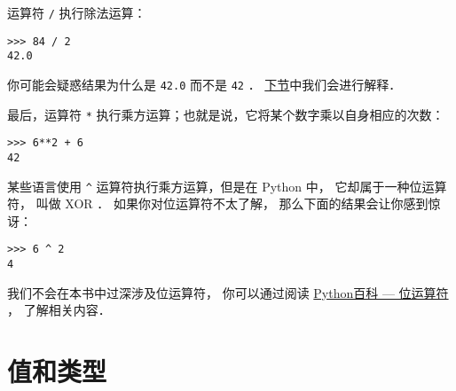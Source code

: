 %

运算符 \lstinline{/} 执行除法运算：


\begin{lstlisting}
>>> 84 / 2
42.0
\end{lstlisting}

%

你可能会疑惑结果为什么是 \lstinline{42.0} 而不是 \lstinline{42} ． \hyperref[value_types]{下节}中我们会进行解释．


最后，运算符 \lstinline{*} 执行乘方运算；也就是说，它将某个数字乘以自身相应的次数：

\begin{lstlisting}
>>> 6**2 + 6
42
\end{lstlisting}


%

某些语言使用 \lstinline{^} 运算符执行乘方运算，但是在 Python 中， 它却属于一种位运算符， 叫做 XOR ． 如果你对位运算符不太了解， 那么下面的结果会让你感到惊讶：

\begin{lstlisting}
>>> 6 ^ 2
4
\end{lstlisting}

%

我们不会在本书中过深涉及位运算符， 你可以通过阅读 \href{http://wiki.python.org/moin/BitwiseOperators}{Python百科 --- 位运算符} ， 了解相关内容．
  
  


\section{值和类型}
    
    
\label{value_types}

